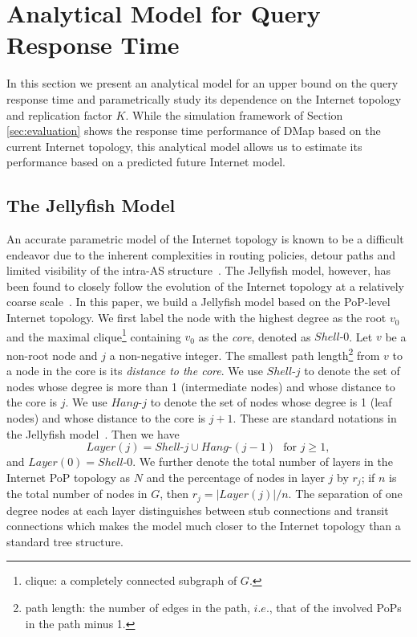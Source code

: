 \section{Analytical Model for Query Response Time}
\label{sec:model}
In this section we present an analytical model for an upper bound on the query response time and parametrically study its dependence on the Internet topology and replication factor $K$. While the simulation framework of Section \ref{sec:evaluation} shows the response time performance of DMap based on the current Internet topology, this analytical model allows us to estimate its performance based on a predicted future Internet model.
\subsection{The Jellyfish Model}
An accurate parametric model of the Internet topology is known to be a difficult endeavor due to the inherent complexities in routing policies, detour paths and limited visibility of the intra-AS structure~\cite{HeSF09}. The Jellyfish model, however, has been found to closely follow the evolution of the Internet topology at a relatively coarse scale~\cite{tauro-jellyfish}. In this paper, we build a Jellyfish model based on the PoP-level Internet topology. We first label the node with the highest degree as the root $v_0$ and the maximal clique\footnote[1]{clique: a completely connected subgraph of $G$.} containing $v_0$ as the {\em core}, denoted as $Shell\textrm{-}0$. Let $v$ be a non-root node and $j$ a non-negative integer. The smallest path length\footnote[2]{path length: the number of edges in the path, $i.e.$, that of the involved PoPs in the path minus 1.} from $v$ to a node in the core is its {\em distance to the core}. We use $Shell\textrm{-}j$ to denote the set of nodes whose degree is more than 1 (intermediate nodes) and whose distance to the core is $j$. We use $Hang\textrm{-}j$ to denote the set of nodes whose degree is 1 (leaf nodes) and whose distance to the core is $j+1$. These are standard notations in the Jellyfish model~\cite{HeSF09}. Then we have
\[
Layer(j) = Shell\textrm{-}j \cup Hang\textrm{-}(j-1) \textrm{~~for~}j \ge 1,
\]
and $Layer(0)=Shell \textrm{-} 0$. We further denote the total number of layers in the Internet PoP topology as $N$ and the percentage of nodes in layer $j$ by $r_j$; if $n$ is the total number of nodes in $G$, then $r_j = \left| Layer(j) \right| / n$. The separation of one degree nodes at each layer distinguishes between stub connections and transit connections which makes the model much closer to the Internet topology than a standard tree structure.

